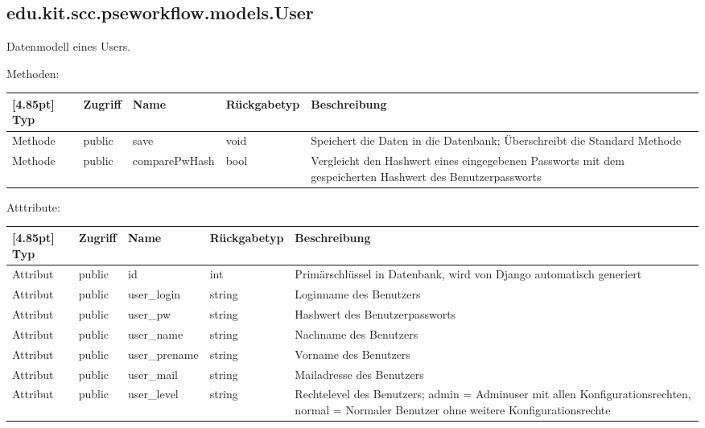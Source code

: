 		\subsection{edu.kit.scc.pseworkflow.models.User}
			Datenmodell eines Users.
			
			Methoden:
			\begin{center}
				\setlength\tabcolsep{5pt}
				\renewcommand{\arraystretch}{1.5}
				
				\begin{tabularx}{\textwidth}{|l|l|l|l|X|}
					\hline
					\rowcolor[gray]{0.75}[4.85pt]
					Typ & Zugriff & Name & Rückgabetyp & Beschreibung \\ \hline 
					Methode & public & save & void & Speichert die Daten in die Datenbank; Überschreibt die Standard Methode \\ 
					Methode & public & comparePwHash & bool & Vergleicht den Hashwert eines eingegebenen Passworts mit dem gespeicherten Hashwert des Benutzerpassworts \\
					\hline
				\end{tabularx}
			\end{center}
			
			Atttribute:
			\begin{center}
				\setlength\tabcolsep{5pt}
				\renewcommand{\arraystretch}{1.5}
				
				\begin{tabularx}{\textwidth}{|l|l|l|l|X|}
					\hline
					\rowcolor[gray]{0.75}[4.85pt]
					Typ & Zugriff & Name & Rückgabetyp & Beschreibung \\ \hline 
					Attribut & public & id & int & Primärschlüssel in Datenbank, wird von Django automatisch generiert \\ \hline
					Attribut & public & user\_login & string & Loginname des Benutzers \\
					Attribut & public & user\_pw & string & Hashwert des Benutzerpassworts\\ \hline
					Attribut & public & user\_name & string & Nachname des Benutzers \\ \hline
					Attribut & public & user\_prename & string & Vorname des Benutzers \\ \hline
					Attribut & public & user\_mail & string & Mailadresse des Benutzers \\ \hline
					Attribut & public & user\_level & string & Rechtelevel des Benutzers; admin = Adminuser mit allen Konfigurationsrechten, normal = Normaler Benutzer ohne weitere Konfigurationsrechte \\
					\hline
				\end{tabularx}
			\end{center}
		
